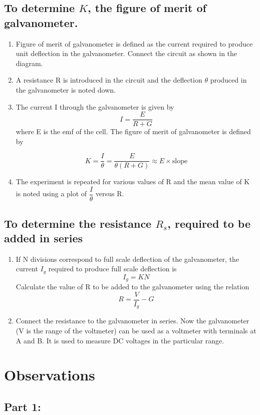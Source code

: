 \documentclass[11pt,a4paper]{article}
\begin{document}
	\subsection{To determine $K$, the figure of merit of galvanometer.}
	\begin{enumerate}
		\item Figure of merit of galvanometer is defined as the current required to produce unit deflection in the galvanometer. Connect the circuit as shown in the diagram.
		\item A resistance R is introduced in the circuit and the deflection $\theta$ produced in the galvanometer is noted down.
		\item The current I through the galvanometer is given by 
			$$ I = \dfrac{E}{R+G}$$
		where E is the emf of the cell.
		The figure of merit of galvanometer is defined by
		
			$$ K = \dfrac{I}{\theta} = \dfrac{E}{\theta(R+G)}\approx E\times \text{slope}$$
		\item The experiment is repeated for various values of R and the mean value of K is noted using a plot of $\dfrac{I}{\theta}$ versus R.
		
			\end{enumerate}
			\subsection{To determine the resistance $R_s$, required to be added in series}
			\begin{enumerate}
				\item If N divisions correspond to full scale deflection of the galvanometer, the current $I_g$ required to produce full scale deflection is 
					$$I_g = KN$$
				Calculate the value of R to be added to the galvanometer using the relation $$ R = \dfrac{V}{I_g} - G$$
				\item Connect the resistance to the galvanometer in series. Now the galvanometer (V is the range of the voltmeter) can be used as a voltmeter with terminals at A and B. It is used to measure DC voltages in the particular range.  
			\end{enumerate}
	\section{Observations}
	\subsection{Part 1:}
	
\end{document}
